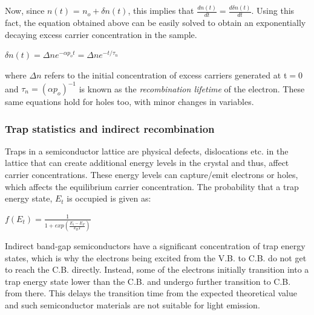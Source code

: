 \documentclass[12 pt]{article}
\begin{document}
Now, since $n(t)$ = $n_{o} + \delta n(t)$, this implies that $ \frac{dn(t)}{dt} = \frac{d\delta n(t)}{dt}$. Using this fact, the equation obtained above can be easily solved to obtain an exponentially decaying excess carrier concentration in the sample.
\begin{center}
    $ \delta n(t) = \Delta ne^{-\alpha p_{o}t} = \Delta ne^{-t/\tau_{n}}  $
\end{center}
where $\Delta n$ refers to the initial concentration of excess carriers generated at t$=0$ and $\tau_{n} = (\alpha p_{o})^{-1}$ is known as the \emph{recombination lifetime} of the electron. These same equations hold for holes too, with minor changes in variables. \par

\subsubsection{Trap statistics and indirect recombination}

Traps in a semiconductor lattice are physical defects, dislocations etc. in the lattice that can create additional energy levels in the crystal and thus, affect carrier concentrations. These energy levels can capture/emit electrons or holes, which affects the equilibrium carrier concentration. The probability that a trap energy state, $E_{t}$ is occupied is given as:
\begin{center}
    $ f(E_{t}) = \frac{1}{1+exp(\frac{E_{t}-E_{F}}{k_{B}T})}$
\end{center}
Indirect band-gap semiconductors have a significant concentration of trap energy states, which is why the electrons being excited from the V.B. to C.B. do not get to reach the C.B. directly. Instead, some of the electrons initially transition into a trap energy state lower than the C.B. and undergo further transition to C.B. from there. This delays the transition time from the expected theoretical value and such semiconductor materials are not suitable for light emission. \newline
\end{document}
